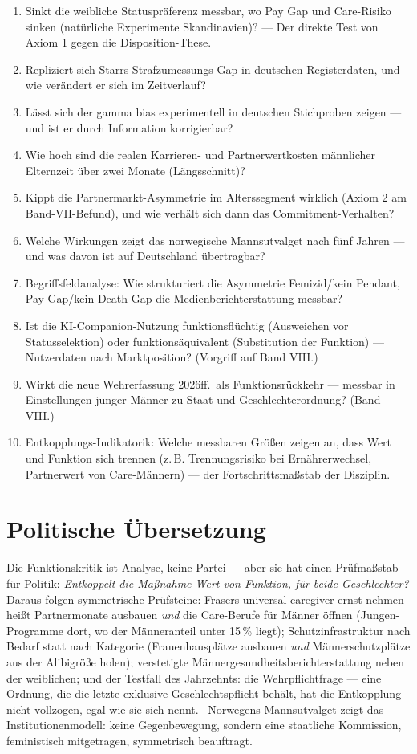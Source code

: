 \begin{enumerate}
\item Sinkt die weibliche Statuspräferenz messbar, wo Pay Gap und Care-Risiko
sinken (natürliche Experimente Skandinavien)? --- Der direkte Test von Axiom 1
gegen die Disposition-These.
\item Repliziert sich Starrs Strafzumessungs-Gap in deutschen Registerdaten,
und wie verändert er sich im Zeitverlauf?
\item Lässt sich der gamma bias experimentell in deutschen Stichproben
zeigen --- und ist er durch Information korrigierbar?
\item Wie hoch sind die realen Karrieren- und Partnerwertkosten männlicher
Elternzeit über zwei Monate (Längsschnitt)?
\item Kippt die Partnermarkt-Asymmetrie im Alterssegment wirklich (Axiom 2 am
Band-VII-Befund), und wie verhält sich dann das Commitment-Verhalten?
\item Welche Wirkungen zeigt das norwegische Mannsutvalget nach fünf Jahren ---
und was davon ist auf Deutschland übertragbar?
\item Begriffsfeldanalyse: Wie strukturiert die Asymmetrie Femizid/kein
Pendant, Pay Gap/kein Death Gap die Medienberichterstattung messbar?
\item Ist die KI-Companion-Nutzung funktionsflüchtig (Ausweichen vor
Statusselektion) oder funktionsäquivalent (Substitution der Funktion) ---
Nutzerdaten nach Marktposition? (Vorgriff auf Band VIII.)
\item Wirkt die neue Wehrerfassung 2026ff.\ als Funktionsrückkehr --- messbar
in Einstellungen junger Männer zu Staat und Geschlechterordnung? (Band VIII.)
\item Entkopplungs-Indikatorik: Welche messbaren Größen zeigen an, dass Wert
und Funktion sich trennen (z.\,B. Trennungsrisiko bei Ernährerwechsel,
Partnerwert von Care-Männern) --- der Fortschrittsmaßstab der Disziplin.
\end{enumerate}

\section{Politische Übersetzung}

Die Funktionskritik ist Analyse, keine Partei --- aber sie hat einen
Prüfmaßstab für Politik: \emph{Entkoppelt die Maßnahme Wert von Funktion, für
beide Geschlechter?} Daraus folgen symmetrische Prüfsteine: Frasers universal
caregiver ernst nehmen heißt Partnermonate ausbauen \emph{und} die
Care-Berufe für Männer öffnen (Jungen-Programme dort, wo der Männeranteil
unter 15\,\% liegt); Schutzinfrastruktur nach Bedarf statt nach Kategorie
(Frauenhausplätze ausbauen \emph{und} Männerschutzplätze aus der
Alibigröße holen); verstetigte Männergesundheitsberichterstattung neben der
weiblichen; und der Testfall des Jahrzehnts: die Wehrpflichtfrage --- eine
Ordnung, die die letzte exklusive Geschlechtspflicht behält, hat die
Entkopplung nicht vollzogen, egal wie sie sich nennt. \plausibel\ Norwegens
Mannsutvalget zeigt das Institutionenmodell: keine Gegenbewegung, sondern eine
staatliche Kommission, feministisch mitgetragen, symmetrisch beauftragt.

